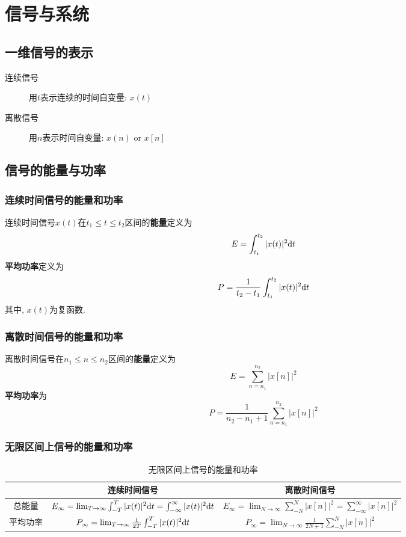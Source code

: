 \section{信号与系统}

    \subsection{一维信号的表示}

        \begin{description}
            \item[连续信号] 用$t$表示连续的时间自变量: $x(t)$
            \item[离散信号] 用$n$表示时间自变量: $x(n)$ or $x[n]$
        \end{description}

    \subsection{信号的能量与功率}

        \subsubsection{连续时间信号的能量和功率}

        连续时间信号$x(t)$在$t_1\leqslant t\leqslant t_2$区间的\textbf{能量}定义为
        \[ E=\int_{t_1}^{t_2}|{x(t)}|^2\mathrm{d} t \]
        \textbf{平均功率}定义为
        \[ P=\frac{1}{t_2-t_1}\int_{t_1}^{t_2}|x(t)|^2\mathrm{d} t \]
        其中, $x(t)$为复函数.

        \subsubsection{离散时间信号的能量和功率}

        离散时间信号在$n_1\leqslant n\leqslant n_2$区间的\textbf{能量}定义为
        \[ E=\sum_{n=n_1}^{n_2}|x[n]|^2 \]
        \textbf{平均功率}为
        \[ P=\frac{1}{n_2-n_1+1}\sum_{n=n_1}^{n_2}|x[n]|^2 \]

        \subsubsection{无限区间上信号的能量和功率}

        \begin{table}[h]\centering
            \caption{无限区间上信号的能量和功率}
            \label{tab:2:universal-energy-and-power}
            \begin{tabular}{ccc} \toprule
                & 连续时间信号 & 离散时间信号 \\ \midrule
                总能量 & $ E_\infty=\lim_{T\to \infty}\int_{-T}^T|x(t)|^2\mathrm{d} t=\int_{-\infty}^\infty|x(t)|^2\mathrm{d} t $ & $E_\infty=\lim_{N\to \infty}\sum_{-N}^N|x[n]|^2=\sum_{-\infty}^\infty|x[n]|^2$\\ 
                平均功率 & $P_\infty=\lim_{T\to \infty}\frac{1}{2T}\int_{-T}^T|x(t)|^2\mathrm{d} t$ & $P_\infty=\lim_{N\to \infty}\frac{1}{2N+1}\sum_{-N}^N|x[n]|^2$ \\ \bottomrule
            \end{tabular}
        \end{table}

